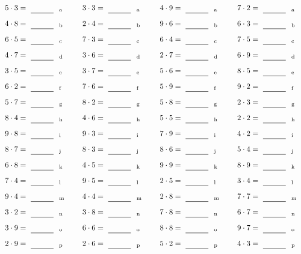 \documentclass
[
  draft    = true,
  fontsize = 11pt,
  parskip  = half-
]
{scrartcl}
\begin{document}
\par\vfill\par
\begin{align*}
    \pline{5\cdot3}&=\rline{a}
  & \pline{3\cdot3}&=\rline{a}
  & \pline{4\cdot9}&=\rline{a}
  & \pline{7\cdot2}&=\rline{a} \\[1ex]
    \pline{4\cdot8}&=\rline{b}
  & \pline{2\cdot4}&=\rline{b}
  & \pline{9\cdot6}&=\rline{b}
  & \pline{6\cdot3}&=\rline{b} \\[1ex]
    \pline{6\cdot5}&=\rline{c}
  & \pline{7\cdot3}&=\rline{c}
  & \pline{6\cdot4}&=\rline{c}
  & \pline{7\cdot5}&=\rline{c} \\[1ex]
    \pline{4\cdot7}&=\rline{d}
  & \pline{3\cdot6}&=\rline{d}
  & \pline{2\cdot7}&=\rline{d}
  & \pline{6\cdot9}&=\rline{d} \\[1ex]
    \pline{3\cdot5}&=\rline{e}
  & \pline{3\cdot7}&=\rline{e}
  & \pline{5\cdot6}&=\rline{e}
  & \pline{8\cdot5}&=\rline{e} \\[1ex]
    \pline{6\cdot2}&=\rline{f}
  & \pline{7\cdot6}&=\rline{f}
  & \pline{5\cdot9}&=\rline{f}
  & \pline{9\cdot2}&=\rline{f} \\[1ex]
    \pline{5\cdot7}&=\rline{g}
  & \pline{8\cdot2}&=\rline{g}
  & \pline{5\cdot8}&=\rline{g}
  & \pline{2\cdot3}&=\rline{g} \\[1ex]
    \pline{8\cdot4}&=\rline{h}
  & \pline{4\cdot6}&=\rline{h}
  & \pline{5\cdot5}&=\rline{h}
  & \pline{2\cdot2}&=\rline{h} \\[1ex]
    \pline{9\cdot8}&=\rline{i}
  & \pline{9\cdot3}&=\rline{i}
  & \pline{7\cdot9}&=\rline{i}
  & \pline{4\cdot2}&=\rline{i} \\[1ex]
    \pline{8\cdot7}&=\rline{j}
  & \pline{8\cdot3}&=\rline{j}
  & \pline{8\cdot6}&=\rline{j}
  & \pline{5\cdot4}&=\rline{j} \\[1ex]
    \pline{6\cdot8}&=\rline{k}
  & \pline{4\cdot5}&=\rline{k}
  & \pline{9\cdot9}&=\rline{k}
  & \pline{8\cdot9}&=\rline{k} \\[1ex]
    \pline{7\cdot4}&=\rline{l}
  & \pline{9\cdot5}&=\rline{l}
  & \pline{2\cdot5}&=\rline{l}
  & \pline{3\cdot4}&=\rline{l} \\[1ex]
    \pline{9\cdot4}&=\rline{m}
  & \pline{4\cdot4}&=\rline{m}
  & \pline{2\cdot8}&=\rline{m}
  & \pline{7\cdot7}&=\rline{m} \\[1ex]
    \pline{3\cdot2}&=\rline{n}
  & \pline{3\cdot8}&=\rline{n}
  & \pline{7\cdot8}&=\rline{n}
  & \pline{6\cdot7}&=\rline{n} \\[1ex]
    \pline{3\cdot9}&=\rline{o}
  & \pline{6\cdot6}&=\rline{o}
  & \pline{8\cdot8}&=\rline{o}
  & \pline{9\cdot7}&=\rline{o} \\[1ex]
    \pline{2\cdot9}&=\rline{p}
  & \pline{2\cdot6}&=\rline{p}
  & \pline{5\cdot2}&=\rline{p}
  & \pline{4\cdot3}&=\rline{p}
\end{align*}
\end{document}
